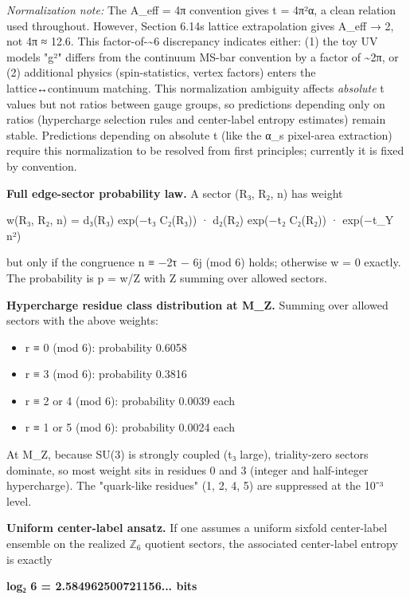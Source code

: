 \emph{Normalization note:} The A\_eff = 4π convention gives t = 4π²α, a clean relation used throughout. However, Section 6.14\textquotesingle s lattice extrapolation gives A\_eff → 2, not 4π ≈ 12.6. This factor-of-\textasciitilde6 discrepancy indicates either: (1) the toy UV model\textquotesingle s "g²" differs from the continuum MS-bar convention by a factor of \textasciitilde2π, or (2) additional physics (spin-statistics, vertex factors) enters the lattice↔continuum matching. This normalization ambiguity affects \emph{absolute} t values but not ratios between gauge groups, so predictions depending only on ratios (hypercharge selection rules and center-label entropy estimates) remain stable. Predictions depending on absolute t (like the α\_s pixel-area extraction) require this normalization to be resolved from first principles; currently it is fixed by convention.

\textbf{Full edge-sector probability law.} A sector (R₃, R₂, n) has weight

w(R₃, R₂, n) = d₃(R₃) exp(−t₃ C₂(R₃)) · d₂(R₂) exp(−t₂ C₂(R₂)) · exp(−t\_Y n²)

but only if the congruence n ≡ −2τ − 6j (mod 6) holds; otherwise w = 0 exactly. The probability is p = w/Z with Z summing over allowed sectors.

\textbf{Hypercharge residue class distribution at M\_Z.} Summing over allowed sectors with the above weights:

\begin{itemize}
\tightlist
\item
  r ≡ 0 (mod 6): probability 0.6058
\item
  r ≡ 3 (mod 6): probability 0.3816
\item
  r ≡ 2 or 4 (mod 6): probability 0.0039 each
\item
  r ≡ 1 or 5 (mod 6): probability 0.0024 each
\end{itemize}

At M\_Z, because SU(3) is strongly coupled (t₃ large), triality-zero sectors dominate, so most weight sits in residues 0 and 3 (integer and half-integer hypercharge). The "quark-like residues" (1, 2, 4, 5) are suppressed at the 10⁻³ level.

\textbf{Uniform center-label ansatz.} If one assumes a uniform sixfold center-label ensemble on the realized \( \mathbb{Z}_6 \) quotient sectors, the associated center-label entropy is exactly

\textbf{log₂ 6 = 2.584962500721156... bits}


